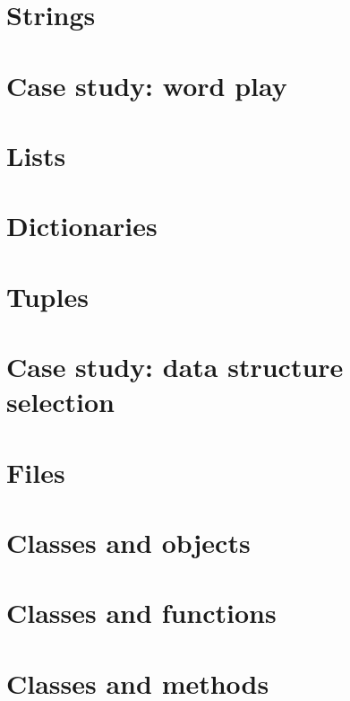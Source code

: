 \documentclass[10pt]{book}
\newcommand{\EN}{\color{red} \normalsize}
\begin{document}
\chapter{Strings}
\label{strings}

\EN
\chapter{Case study: word play}

\EN
\chapter{Lists}

\EN
\chapter{Dictionaries}

\EN
\chapter{Tuples}
\label{tuplechap}

\EN
\chapter{Case study: data structure selection}

\EN
\chapter{Files}

\EN
\chapter{Classes and objects}

\EN
\chapter{Classes and functions}
\label{time}

\EN
\chapter{Classes and methods}

\EN
\end{document}
